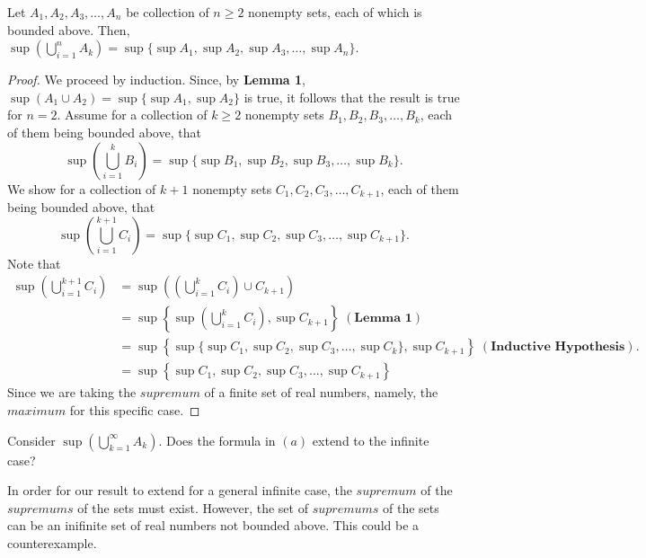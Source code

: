 \documentclass[12pt]{article}
\newenvironment{theorem}[2][Theorem]{\begin{trivlist}
		\item[\hskip \labelsep {\bfseries #1}\hskip \labelsep {\bfseries #2.}]}{\end{trivlist}}
\newenvironment{problem}[2][Problem]{\begin{trivlist}
		\item[\hskip \labelsep {\bfseries #1}\hskip \labelsep {\bfseries #2.}]}{\end{trivlist}}
\newenvironment{solution}[2][Solution]{\begin{trivlist}
		\item[\hskip \labelsep {\bfseries #1}\hskip \labelsep {\bfseries #2.}]}{\end{trivlist}}
\begin{document}
\begin{problem}{1.3.4}
\begin{enumerate}[label=(\alph*)]
\begin{solution}{(a)}
					\begin{theorem}{1}
						Let $A_{1},A_{2},A_{3},\ldots, A_{n}$ be collection of $n\geq 2$ nonempty sets, each of which is bounded above. Then, $\sup\left(\bigcup_{i=1}^{n} A_{k}\right) = \sup\{\sup A_{1},\sup A_{2}, \sup A_{3}, \ldots, \sup A_{n}\}$.
						\begin{proof}
							We proceed by induction. Since, by \textbf{Lemma 1}, $\sup (A_{1}\cup A_{2}) = \sup\{\sup A_{1}, \sup A_{2}\}$ is true, it follows that the result is true for $n=2$. Assume for a collection of $k\geq 2$ nonempty sets $B_{1},B_{2},B_{3},\ldots,B_{k}$, each of them being bounded above, that
							\begin{equation*}
								\sup\left(\bigcup_{i=1}^{k} B_{i}\right) = \sup\{\sup B_{1},\sup B_{2}, \sup B_{3}, \ldots,\sup B_{k}\}.
							\end{equation*} 
						We show for a collection of $k+1$ nonempty sets $C_{1},C_{2},C_{3},\ldots,C_{k+1}$, each of them being bounded above, that
						\begin{equation*}
							\sup\left(\bigcup_{i=1}^{k+1} C_{i}\right) = \sup\{\sup C_{1},\sup C_{2}, \sup C_{3}, \ldots,\sup C_{k+1}\}.
						\end{equation*} 
						Note that
						\begin{align*}
							\sup\left(\bigcup_{i=1}^{k+1} C_{i}\right) &= \sup\left(\left(\bigcup_{i=1}^{k} C_{i}\right) \cup C_{k+1}\right)\\
							&= \sup\left\{\sup\left(\bigcup_{i=1}^{k} C_{i}\right),\sup C_{k+1}\right\} \; (\textbf{Lemma 1})\\
							&= \sup\left\{\sup\{\sup C_{1},\sup C_{2}, \sup C_{3}, \ldots,\sup C_{k}\},\sup C_{k+1}\right\} \; (\textbf{Inductive Hypothesis}).\\
							&= \sup\left\{\sup C_{1},\sup C_{2}, \sup C_{3}, \ldots,\sup C_{k+1}\right\}
						\end{align*}
					Since we are taking the $supremum$ of a finite set of real numbers, namely, the $maximum$ for this specific case.
						\end{proof}
					\end{theorem}
				\end{solution}
				\item Consider $\sup\left(\bigcup_{k=1}^{\infty} A_{k}\right)$. Does the formula in $(a)$ extend to the infinite case?
				\begin{solution}{(b)}
					In order for our result to extend for a general infinite case, the $supremum$ of the $supremums$ of the sets must exist. However, the set of $supremums$ of the sets can be an inifinite set of real numbers not bounded above. This could be a counterexample. 
				\end{solution}
			\end{enumerate}
			
		\end{problem}
	
\end{document}
